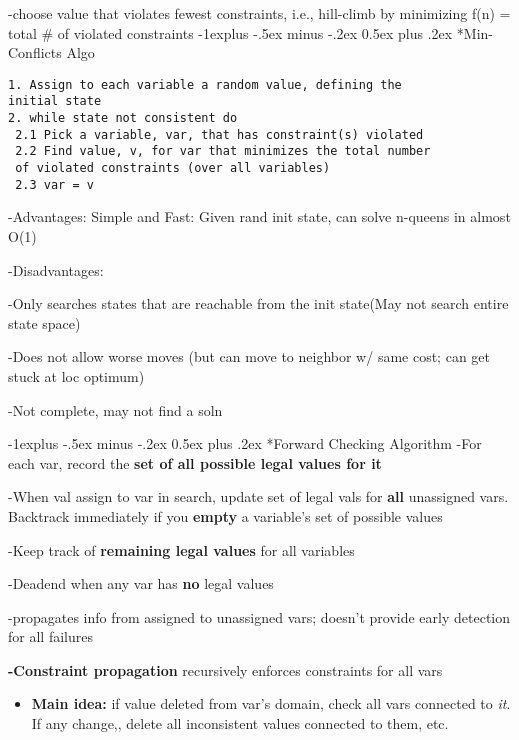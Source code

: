 \documentclass[10pt,landscape]{article}
\makeatletter
\renewcommand{\subsection}{\@startsection{subsection}{2}{0mm}%
                                {-1explus -.5ex minus -.2ex}%
                                {0.5ex plus .2ex}%
                                {\normalfont\footnotesize\bfseries}}
\makeatother
\begin{document}
\begin{multicols}{3}
-choose value that violates fewest constraints, i.e., hill-climb by minimizing f(n) = total \# of violated constraints
\subsection{*Min-Conflicts Algo}
\setlength\partopsep{-\topsep}
\addtolength\partopsep{-\parskip}
\addtolength\partopsep{0em}
\begin{verbatim}
1. Assign to each variable a random value, defining the 
initial state
2. while state not consistent do
 2.1 Pick a variable, var, that has constraint(s) violated
 2.2 Find value, v, for var that minimizes the total number 
 of violated constraints (over all variables)
 2.3 var = v
\end{verbatim}

-Advantages:
Simple and Fast: Given rand init state, can solve n-queens in almost O(1)

-Disadvantages:

\quad -Only searches states that are reachable from the init state(May not search entire state space)

\quad -Does not allow worse moves (but can move to neighbor w/ same cost; can get stuck at loc optimum)

\quad -Not complete, may not find a soln 

\subsection{*Forward Checking Algorithm}
-For each var, record the \textbf{set of all possible legal values for it}

-When val assign to var in search, update set of legal vals for \textbf{all} unassigned vars.  Backtrack immediately if you \textbf{empty} a variable's set of possible values

-Keep track of \textbf{remaining legal values} for all variables

-Deadend when any var has \textbf{no} legal values

-propagates info from assigned to unassigned vars; doesn't provide early detection for all failures

\textbf{-Constraint propagation} recursively enforces constraints for all vars
\linespread{0}
\begin{itemize}
\item \textbf{Main idea:} if value deleted from var's domain, check all vars connected to \emph{it}. If any change,, delete all inconsistent values connected to them, etc.
\end{itemize}



\end{multicols}
\end{document}
